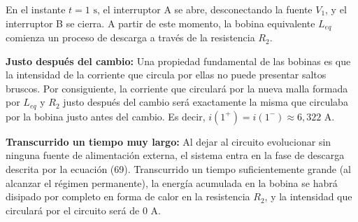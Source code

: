 \documentclass[11pt, a4paper]{article}
\newenvironment{problem}[1][Cuestión]{
		\vspace{0.5cm}
		\noindent{\Large\bfseries #1} \par\vspace{0.5cm}
}{
		\vspace{0.5cm}
}
\begin{document}
\begin{problem}[Cuestión 3]
\begin{enumerate}[label=\alph*)]
				{ \color{blue} 
					En el instante $t=1 \text{ s}$, el interruptor A se abre, desconectando la fuente $V_1$, y el interruptor B se cierra. A partir de este momento, la bobina equivalente $L_{eq}$ comienza un proceso de descarga a través de la resistencia $R_2$.

					\textbf{Justo después del cambio:}
					Una propiedad fundamental de las bobinas es que la intensidad de la corriente que circula por ellas no puede presentar saltos bruscos. Por consiguiente, la corriente que circulará por la nueva malla formada por $L_{eq}$ y $R_2$ justo después del cambio será exactamente la misma que circulaba por la bobina justo antes del cambio. Es decir, $\boxed{i(1^+) = i(1^-) \approx 6,322 \text{ A}}$.

					\textbf{Transcurrido un tiempo muy largo:}
					Al dejar al circuito evolucionar sin ninguna fuente de alimentación externa, el sistema entra en la fase de descarga descrita por la ecuación (69). Transcurrido un tiempo suficientemente grande (al alcanzar el régimen permanente), la energía acumulada en la bobina se habrá disipado por completo en forma de calor en la resistencia $R_2$, y la intensidad que circulará por el circuito será de $\boxed{0 \text{ A}}$.
				}
		\end{enumerate}
	\end{problem}
\end{document}
